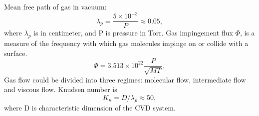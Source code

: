 Mean free path of gas in vacuum:
\[
\lambda_p = \frac{5\times10^{-3}}{P} \approx 0.05,
\]
where $\lambda_p$ is in centimeter, and P is pressure in Torr. Gas impingement flux $\Phi$, is a measure of the frequency with which gas molecules impinge on or collide with a surface.
\[
\Phi = 3.513\times10^{22}\frac{P}{\sqrt{M T}},
\]
Gas flow could be divided into three regimes: molecular flow, intermediate flow and viscous flow.
Knudsen number is
\[
K_n = D/\lambda_p \approx 50,
\]
where D is characteristic dimension of the CVD system. 